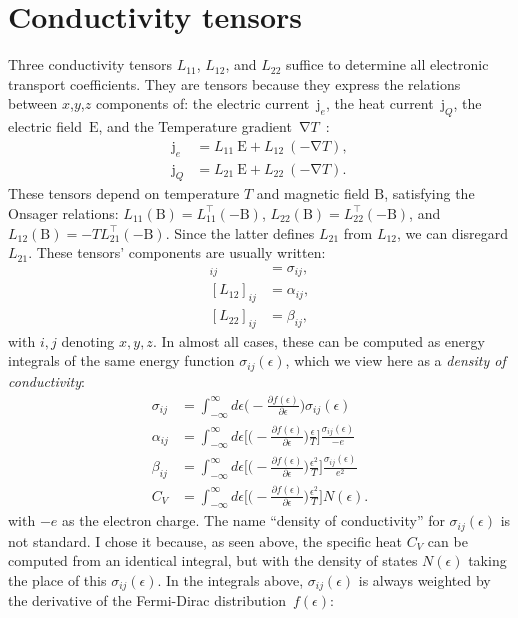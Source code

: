 \documentclass[notitlepage,11pt,nofootinbib]{revtex4-1}
\renewcommand{\vec}[1]{\bm{\mathrm{#1}}}
\begin{document}
\section{Conductivity tensors}
\noindent
Three conductivity tensors $L_{11}$, $L_{12}$, and $L_{22}$ suffice to determine all electronic transport coefficients. They are tensors because they express the relations between $x$,$y$,$z$ components of: the electric current~$\vec j_e$, the heat current~$\vec j_Q$, the electric field~$\vec E$, and the Temperature gradient~$\vec \nabla T$~\cite{ashcroft_solid_1976,arsenault_transport_2013}:
\begin{align}
\vec j_e &= L_{11}\ \vec E + L_{12}\ (-\vec \nabla T),\\
\vec j_Q &= L_{21}\ \vec E + L_{22}\ (-\vec \nabla T).
\end{align}
These tensors depend on temperature $T$ and magnetic field $\vec B$, satisfying the Onsager relations:
$L_{11}(\vec B) = L_{11}^{\top}(-\vec B)$, $L_{22}(\vec B) = L_{22}^{\top}(-\vec B)$, and
$L_{12}(\vec B) = -TL_{21}^{\top}(-\vec B)$. Since
the latter defines $L_{21}$ from $L_{12}$, we can disregard $L_{21}$. These tensors' components are usually written:
\begin{align}
[L_{11}]_{ij} &= \sigma_{ij},
\\
[L_{12}]_{ij} &= \alpha_{ij},
\\
[L_{22}]_{ij} &= \beta_{ij},
\end{align}
with $i,j$ denoting $x,y,z$. In almost all cases, these can be computed as energy integrals of the same energy function $\sigma_{ij}(\epsilon)$, which we view here as a \emph{density of conductivity}:
\begin{align}
\sigma_{ij}
&=
\int_{-\infty}^{\infty} d\epsilon
\Big(-\frac{\partial f(\epsilon)}{\partial \epsilon}\Big)\sigma_{ij}(\epsilon)
\label{sigma}
\\
\alpha_{ij}
&=
\int_{-\infty}^{\infty}d\epsilon
\bigg[\Big(-\frac{\partial f(\epsilon)}{\partial \epsilon}\Big)\frac{\epsilon}{T}\bigg]\frac{\sigma_{ij}(\epsilon)}{-e}
\label{alpha}
\\
\beta_{ij}
&=
\int_{-\infty}^{\infty}d\epsilon
\bigg[\Big(-\frac{\partial f(\epsilon)}{\partial \epsilon}\Big)\frac{\epsilon^2}{T}\bigg]\frac{\sigma_{ij}(\epsilon)}{e^2}
\label{beta}
\\
C_V
&=
\int_{-\infty}^{\infty}d\epsilon
\bigg[\Big(-\frac{\partial f(\epsilon)}{\partial \epsilon}\Big)\frac{\epsilon^2}{T}\bigg]N(\epsilon).
\label{Cv}
\end{align}
with $-e$ as the electron charge. The name ``density of conductivity'' for $\sigma_{ij}(\epsilon)$ is not standard. I chose it because, as seen above, the specific heat $C_V$ can be computed from an identical integral, but with the density of states $N(\epsilon)$ taking the place of this $\sigma_{ij}(\epsilon)$. In the integrals above, $\sigma_{ij}(\epsilon)$ is always weighted by the derivative of the Fermi-Dirac distribution~$f(\epsilon)$:
\end{document}
